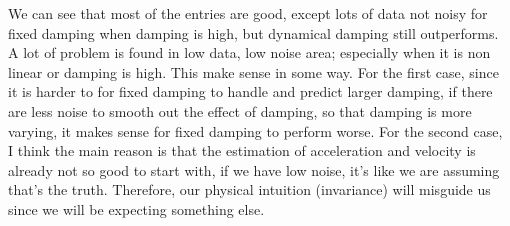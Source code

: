 \documentclass{article}
\begin{document}
We can see that most of the entries are good, except lots of data not noisy for fixed damping when damping is high, but dynamical damping still outperforms.
A lot of problem is found in low data, low noise area; especially when it is non linear or damping is high. 
This make sense in some way.
For the first case, since it is harder to for fixed damping to handle and predict larger damping, if there are less noise to smooth out the effect of damping, so that damping is more varying, it makes sense for fixed damping to perform worse. 
For the second case, I think the main reason is that the estimation of acceleration and velocity is already not so good to start with, if we have low noise, it's like we are assuming that's the truth.
Therefore, our physical intuition (invariance) will misguide us since we will be expecting something else. 
\end{document}
